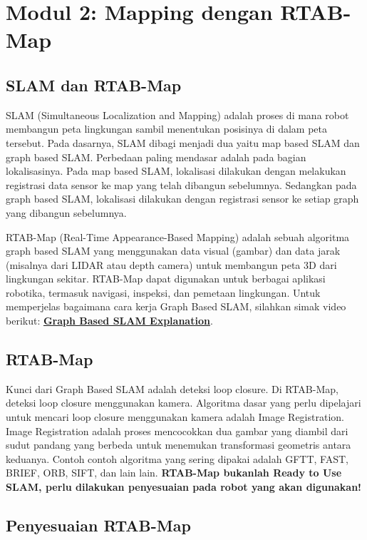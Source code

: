\documentclass{article}
\begin{document}
\section{Modul 2: Mapping dengan RTAB-Map}

\subsection{SLAM dan RTAB-Map}
SLAM (Simultaneous Localization and Mapping) adalah proses di mana robot membangun peta lingkungan sambil menentukan posisinya di dalam peta tersebut. Pada dasarnya, SLAM dibagi menjadi dua yaitu map based SLAM dan graph based SLAM. Perbedaan paling mendasar adalah pada bagian lokalisasinya. Pada map based SLAM, lokalisasi dilakukan dengan melakukan registrasi data sensor ke map yang telah dibangun sebelumnya. Sedangkan pada graph based SLAM, lokalisasi dilakukan dengan registrasi sensor ke setiap graph yang dibangun sebelumnya.
\par
RTAB-Map (Real-Time Appearance-Based Mapping) adalah sebuah algoritma graph based SLAM yang menggunakan data visual (gambar) dan data jarak (misalnya dari LIDAR atau depth camera) untuk membangun peta 3D dari lingkungan sekitar. RTAB-Map dapat digunakan untuk berbagai aplikasi robotika, termasuk navigasi, inspeksi, dan pemetaan lingkungan. Untuk memperjelas bagaimana cara kerja Graph Based SLAM, silahkan simak video berikut: \href{https://youtu.be/saVZtgPyyJQ?si=qHGGJnJUz-iB19UF}{\textbf{Graph Based SLAM Explanation}}.

\subsection{RTAB-Map}
Kunci dari Graph Based SLAM adalah deteksi loop closure. Di RTAB-Map, deteksi loop closure menggunakan kamera. Algoritma dasar yang perlu dipelajari untuk mencari loop closure menggunakan kamera adalah Image Registration. Image Registration adalah proses mencocokkan dua gambar yang diambil dari sudut pandang yang berbeda untuk menemukan transformasi geometris antara keduanya. Contoh contoh algoritma yang sering dipakai adalah GFTT, FAST, BRIEF, ORB, SIFT, dan lain lain.
\newline
\textbf{RTAB-Map bukanlah Ready to Use SLAM, perlu dilakukan penyesuaian pada robot yang akan digunakan!}

\subsection{Penyesuaian RTAB-Map}
\end{document}

